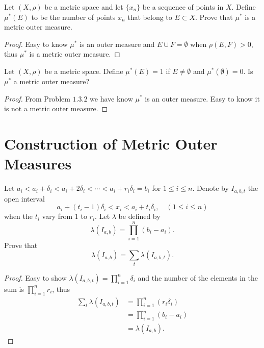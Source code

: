 \begin{pro}%
	Let $(X,\rho)$ be a metric space and let $\{x_n\}$ be a sequence of points in $X$. Define $\mu^*(E)$ to be the number of points $x_n$ that belong to $E\subset X$. Prove that $\mu^*$ is a metric outer measure.
\end{pro}
\begin{proof}
	Easy to know $\mu^*$ is an outer measure and $E\cup F=\emptyset$ when $\rho(E,F)>0$, thus $\mu^*$ is a metric outer measure.
\end{proof}

\begin{pro}%
	Let $(X,\rho)$ be a metric space. Define $\mu^*(E)=1$ if $E\neq \emptyset$ and $\mu^*(\emptyset)=0$. Is $\mu^*$ a metric outer measure?
\end{pro}
\begin{proof}
	From Problem $1.3.2$ we have know $\mu^*$ is an outer measure. Easy to know it is not a metric outer measure.
\end{proof}

\section{Construction of Metric Outer Measures}
\begin{pro}%
	Let $a_i<a_i+\delta_i<a_i+2\delta_i<\cdots<a_i+r_i\delta_i=b_i$ for $1\leq i\leq n$. Denote by $I_{a,b,t}$ the open interval
	\[a_i+(t_i-1)\delta_i<x_i<a_i+t_i\delta_i,\quad (1\leq i\leq n)\]
	when the $t_i$ vary from $1$ to $r_i$. Let $\lambda$ be defined by 
	\[\lambda(I_{a,b})=\prod_{i=1}^n (b_i-a_i).\]
	Prove that 
	\[\lambda(I_{a,b})=\sum_{t}\lambda(I_{a,b,t}).\]
\end{pro}
\begin{proof}
	Easy to show $\lambda(I_{a,b,t})=\prod_{i=1}^n \delta_i$ and the number of the elements in the sum is $\prod_{i=1}^n r_i$, thus
	\begin{align*}
		\sum_{t}\lambda(I_{a,b,t})
		&=\prod_{i=1}^n (r_i\delta_i)\\
		&=\prod_{i=1}^n (b_i-a_i)\\
		&=\lambda(I_{a,b}).
	\end{align*}
\end{proof}

